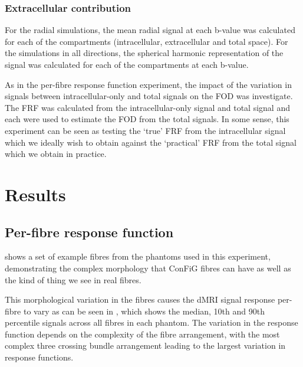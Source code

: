 \subsubsection{Extracellular contribution}
\label{sec:frf_sig_proc_extra}
For the radial simulations, the mean radial signal at each b-value was calculated for each of the compartments (intracellular, extracellular and total space). For the simulations in all directions, the spherical harmonic representation of the signal was calculated for each of the compartments at each b-value.

As in the per-fibre response function experiment, the impact of the variation in signals between intracellular-only and total signals on the \ac{FOD} was investigate. The \ac{FRF} was calculated from the intracellular-only signal and total signal and each were used to estimate the \ac{FOD} from the total signals. In some sense, this experiment can be seen as testing the `true' \ac{FRF} from the intracellular signal which we ideally wish to obtain against the `practical' \ac{FRF} from the total signal which we obtain in practice.


\section{Results}
\label{sec:frf_results}



\subsection{Per-fibre response function}
\label{sec:frf_res_per_fibre}


 shows a set of example fibres from the phantoms used in this experiment, demonstrating the complex morphology that ConFiG fibres can have as well as the kind of thing we see in real fibres.

This morphological variation in the fibres causes the \ac{dMRI} signal response per-fibre to vary as can be seen in , which shows the median, 10th and 90th percentile signals across all fibres in each phantom.
The variation in the response function depends on the complexity of the fibre arrangement, with the most complex three crossing bundle arrangement leading to the largest variation in response functions.


